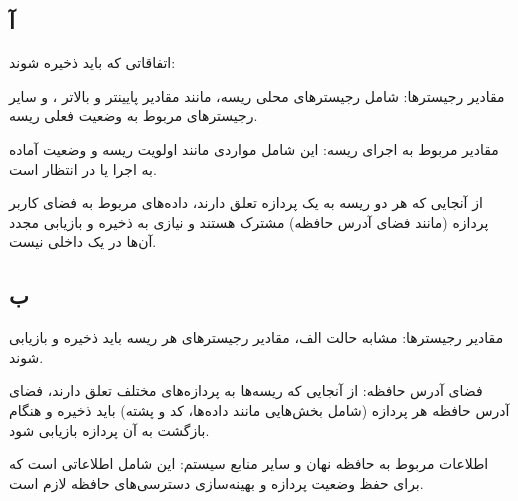 \subsection*{آ}
اتفاقاتی که باید ذخیره شوند:

مقادیر رجیستر‌ها: شامل رجیسترهای محلی ریسه، مانند مقادیر پایینتر و بالاتر ،  و سایر رجیسترهای مربوط به وضعیت فعلی ریسه.

مقادیر مربوط به اجرای ریسه: این شامل مواردی مانند اولویت ریسه و وضعیت آماده به اجرا یا در انتظار است.

از آنجایی که هر دو ریسه به یک پردازه تعلق دارند، داده‌های مربوط به فضای کاربر پردازه (مانند فضای آدرس حافظه) مشترک هستند و نیازی به ذخیره و بازیابی مجدد آن‌ها در یک  داخلی نیست.

\subsection*{ب}
مقادیر رجیستر‌ها: مشابه حالت الف، مقادیر رجیستر‌های هر ریسه باید ذخیره و بازیابی شوند.

فضای آدرس حافظه: از آنجایی که ریسه‌ها به پردازه‌های مختلف تعلق دارند، فضای آدرس حافظه هر پردازه (شامل بخش‌هایی مانند داده‌ها، کد و پشته) باید ذخیره و هنگام بازگشت به آن پردازه بازیابی شود.

اطلاعات مربوط به حافظه نهان و سایر منابع سیستم: این شامل اطلاعاتی است که برای حفظ وضعیت پردازه و بهینه‌سازی دسترسی‌های حافظه لازم است.
